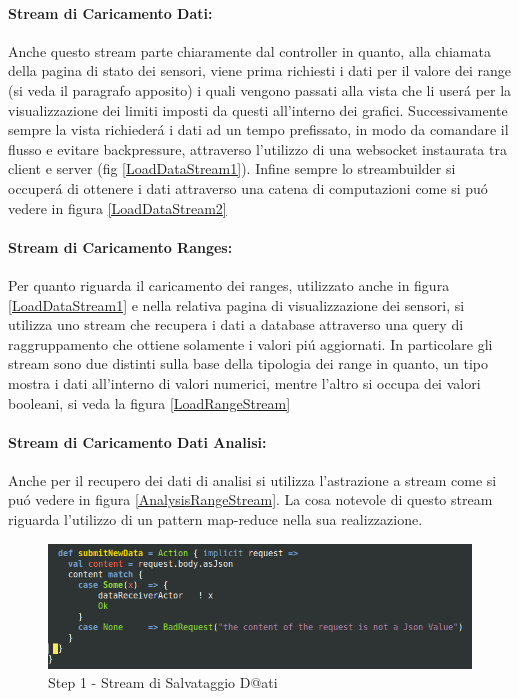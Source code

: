 \paragraph{Stream di Caricamento Dati:} Anche questo stream parte chiaramente dal controller in quanto, alla chiamata della pagina di stato dei sensori, viene prima richiesti i dati per il valore dei range (si veda il paragrafo apposito) i quali vengono passati alla vista che li user\'a per la visualizzazione dei limiti imposti da questi all'interno dei grafici. Successivamente sempre la vista richieder\'a i dati ad un tempo prefissato, in modo da comandare il flusso e evitare backpressure, attraverso l'utilizzo di una websocket instaurata tra client e server (fig \ref{LoadDataStream1}). Infine sempre lo streambuilder si occuper\'a di ottenere i dati attraverso una catena di computazioni come si pu\'o vedere in figura \ref{LoadDataStream2}

\paragraph{Stream di Caricamento Ranges:} Per quanto riguarda il caricamento dei ranges, utilizzato anche in figura \ref{LoadDataStream1} e nella relativa pagina di visualizzazione dei sensori, si utilizza uno stream che recupera i dati a database attraverso una query di raggruppamento che ottiene solamente i valori pi\'u aggiornati. In particolare gli stream sono due distinti sulla base della tipologia dei range in quanto, un tipo mostra i dati all'interno di valori numerici, mentre l'altro si occupa dei valori booleani, si veda la figura \ref{LoadRangeStream}

\paragraph{Stream di Caricamento Dati Analisi:} Anche per il recupero dei dati di analisi si utilizza l'astrazione a stream come si pu\'o vedere in figura \ref{AnalysisRangeStream}. La cosa notevole di questo stream riguarda l'utilizzo di un pattern map-reduce nella sua realizzazione.

\begin{figure}[h]
\centering
\includegraphics[scale=0.5,natwidth=610,natheight=642]{Figures/Project/Server/Interaction/SaveDataStream/DataStream1.png}
\caption{Step 1 - Stream di Salvataggio D@ati}
\label{SaveDataStream1}
\end{figure}

